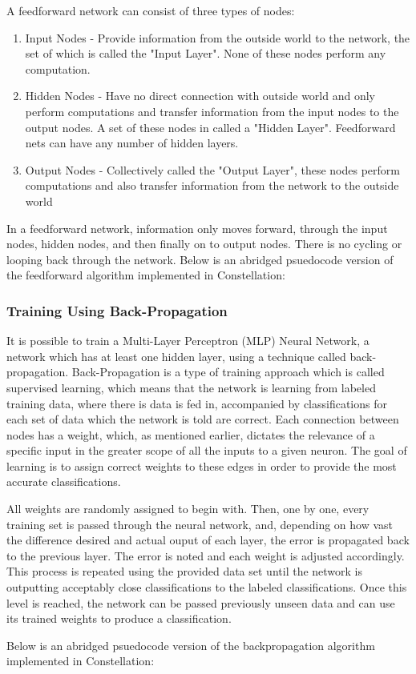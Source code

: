 A feedforward network can consist of three types of nodes:
\begin{enumerate}
    \item Input Nodes - Provide information from the outside world to the network, the set of which is called the "Input Layer". None of these nodes perform any computation.
    \item Hidden Nodes - Have no direct connection with outside world and only perform computations and transfer information from the input nodes to the output nodes. A set of these nodes in called a "Hidden Layer". Feedforward nets can have any number of hidden layers.
    \item Output Nodes - Collectively called the "Output Layer", these nodes perform computations and also transfer information from the network to the outside world
\end{enumerate}

In a feedforward network, information only moves forward, through the input nodes, hidden nodes, and then finally on to output nodes. There is no cycling or looping back through the network. Below is an abridged psuedocode version of the feedforward algorithm implemented in Constellation:


\subsubsection{Training Using Back-Propagation}
It is possible to train a Multi-Layer Perceptron (MLP) Neural Network, a network which has at least one hidden layer, using a technique called back-propagation. Back-Propagation is a type of training approach which is called supervised learning, which means that the network is learning from labeled training data, where there is data is fed in, accompanied by classifications for each set of data which the network is told are correct. Each connection between nodes has a weight, which, as mentioned earlier, dictates the relevance of a specific input in the greater scope of all the inputs to a given neuron. The goal of learning is to assign correct weights to these edges in order to provide the most accurate classifications.

All weights are randomly assigned to begin with. Then, one by one, every training set is passed through the neural network, and, depending on how vast the difference desired and actual ouput of each layer, the error is propagated back to the previous layer. The error is noted and each weight is adjusted accordingly. This process is repeated using the provided data set until the network is outputting acceptably close classifications to the labeled classifications. Once this level is reached, the network can be passed previously unseen data and can use its trained weights to produce a classification. 

Below is an abridged psuedocode version of the backpropagation algorithm implemented in Constellation:
